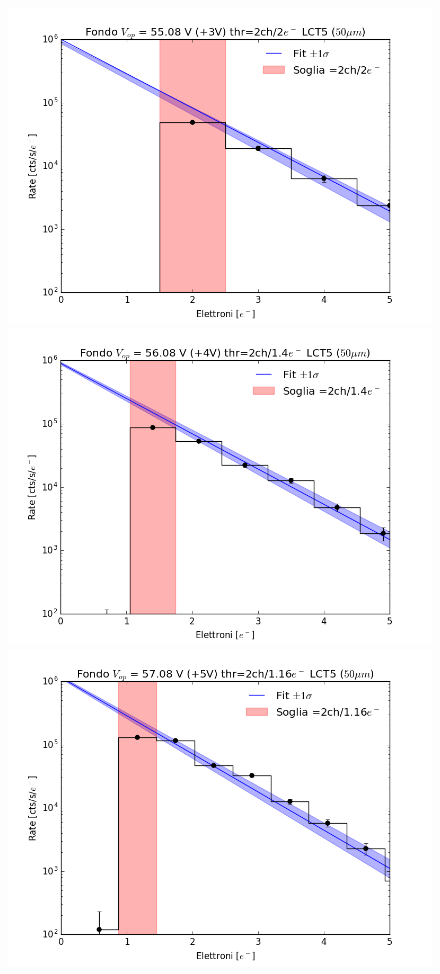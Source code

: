 \documentclass[10pt,a4paper, openany]{book}
\begin{document}
\begin{figure}[!h]
\begin{center}
\includegraphics[scale=0.26]{imm/fit3_2.png}
\includegraphics[scale=0.26]{imm/fit4_2.png}
\includegraphics[scale=0.26]{imm/fit5_2.png}

\end{center}
\end{figure}
\end{document}
